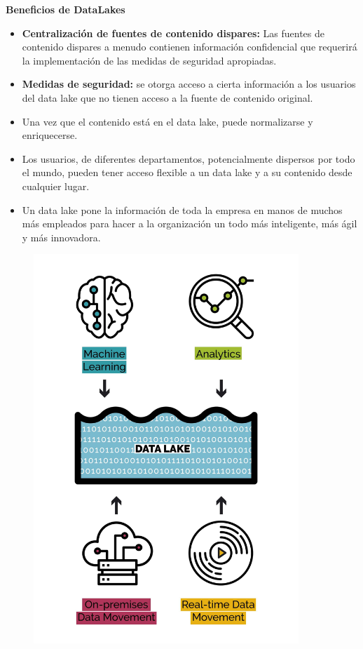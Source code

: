 \documentclass[%
 reprint,
 amsmath,amssymb,
 aps,
]{revtex4-1}
\begin{document}
\textbf{Beneficios de DataLakes}
\begin{itemize}
	\item \textbf{ Centralización de fuentes de contenido dispares:} Las fuentes de contenido dispares a menudo contienen información confidencial que requerirá la implementación de las medidas de seguridad apropiadas.
	\item  \textbf{ Medidas de seguridad:} se otorga acceso a cierta información a los usuarios del data lake que no tienen acceso a la fuente de contenido original. 
	\item  Una vez que el contenido está en el data lake, puede normalizarse y enriquecerse. 
	\item  Los usuarios, de diferentes departamentos, potencialmente dispersos por todo el mundo, pueden tener acceso flexible a un data lake y a su contenido desde cualquier lugar.
	\item Un data lake pone la información de toda la empresa en manos de muchos más empleados para hacer a la organización un todo más inteligente, más ágil y más innovadora.
\end{itemize}

\begin{figure}[htb]
				\begin{center}
					\includegraphics[width=10cm]{./IMAGENES/datalake}
				\end{center}
			\end{figure}
\end{document}
